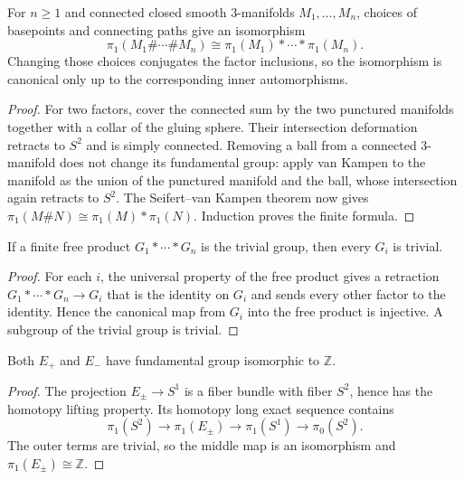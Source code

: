 \begin{theorem}
\label{thm:connected-sum-fundamental-group}
\notready
For $n\ge1$ and connected closed smooth $3$-manifolds
$M_1,\ldots,M_n$, choices of basepoints and connecting paths give an
isomorphism
\[
 \pi_1(M_1\#\cdots\#M_n)
 \cong \pi_1(M_1)*\cdots*\pi_1(M_n).
\]
Changing those choices conjugates the factor inclusions, so the isomorphism
is canonical only up to the corresponding inner automorphisms.
\end{theorem}

\begin{proof}
For two factors, cover the connected sum by the two punctured manifolds
together with a collar of the gluing sphere.  Their intersection deformation
retracts to $S^2$ and is simply connected.  Removing a ball from a connected
$3$-manifold does not change its fundamental group: apply van Kampen to the
manifold as the union of the punctured manifold and the ball, whose
intersection again retracts to $S^2$.  The Seifert--van Kampen theorem now
gives $\pi_1(M\#N)\cong\pi_1(M)*\pi_1(N)$.  Induction proves the finite formula.
\end{proof}

\begin{lemma}
\label{lem:trivial-free-product-factors}
\notready
If a finite free product $G_1*\cdots*G_n$ is the trivial group, then every
$G_i$ is trivial.
\end{lemma}

\begin{proof}
For each $i$, the universal property of the free product gives a retraction
$G_1*\cdots*G_n\to G_i$ that is the identity on $G_i$ and sends every other
factor to the identity.  Hence the canonical map from $G_i$ into the free
product is injective.  A subgroup of the trivial group is trivial.
\end{proof}

\begin{lemma}
\label{lem:sphere-bundle-fundamental-group}
\notready
Both $E_+$ and $E_-$ have fundamental group isomorphic to $\mathbb Z$.
\end{lemma}

\begin{proof}
The projection $E_\pm\to S^1$ is a fiber bundle with fiber $S^2$, hence has
the homotopy lifting property.  Its homotopy long exact sequence contains
\[
 \pi_1(S^2)\longrightarrow\pi_1(E_\pm)
 \longrightarrow\pi_1(S^1)\longrightarrow\pi_0(S^2).
\]
The outer terms are trivial, so the middle map is an isomorphism and
$\pi_1(E_\pm)\cong\mathbb Z$.
\end{proof}

